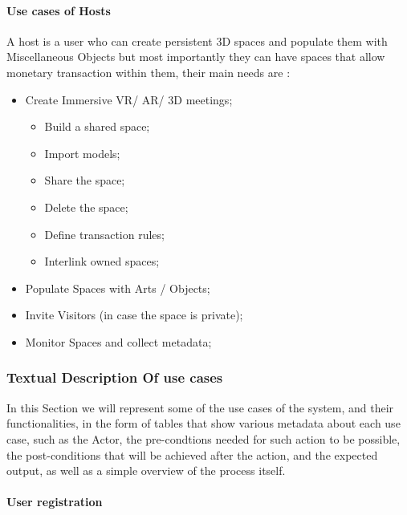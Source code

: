   \paragraph {Use cases of Hosts}
  A host is a user who can create persistent 3D spaces and populate them with Miscellaneous Objects but most importantly they can have spaces that allow monetary transaction within them, their main needs are : 
  \begin{itemize}
    \item Create Immersive \ac{VR}/ \ac{AR}/ \ac{3D} meetings;
    \begin{itemize}
      \item Build a shared space;
      \item Import models;
      \item Share the space;
      \item Delete the space;
      \item Define transaction rules;
      \item Interlink owned spaces;
    \end{itemize}
    \item Populate Spaces with Arts / Objects;
    \item Invite Visitors (in case the space is private); 
    \item Monitor Spaces and collect metadata;
  \end{itemize}
  \subsubsection{Textual Description Of use cases}
  In this Section we will represent some of the use cases of the system, and their functionalities, in the form of tables that show 
  various metadata about each use case, such as the Actor, the pre-condtions needed for such action to be possible, the post-conditions
  that will be achieved after the action, and the expected output, as well as a simple overview of the process itself. 
  \pagebreak
  \paragraph{User registration}
 
